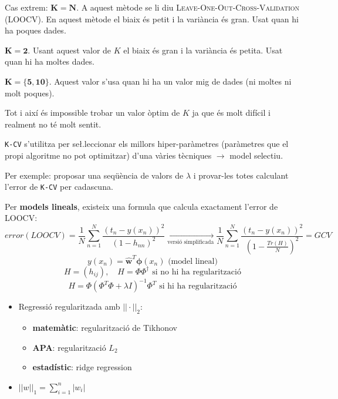 \documentclass[a4paper]{article}
\begin{document}
Cas extrem: $\boldsymbol{K=N}$. A aquest mètode se li diu \textsc{Leave-One-Out-Cross-Validation} (LOOCV). En aquest mètode el biaix és petit i la variància és gran. Usat quan hi ha poques dades.

$\boldsymbol{K=2}$. Usant aquest valor de $K$ el biaix és gran i la variància és petita. Usat quan hi ha moltes dades.

$\boldsymbol{K=\{5,10\}}$. Aquest valor s'usa quan hi ha un valor mig de dades (ni moltes ni molt poques).

Tot i així és impossible trobar un valor òptim de $K$ ja que és molt difícil i realment no té molt sentit.

\verb|K-CV| s'utilitza per se\l.leccionar els millors hiper-paràmetres (paràmetres que el propi algoritme no pot optimitzar) d'una vàries tècniques $\rightarrow$ model selectiu.

Per exemple: proposar una seqüència de valors de $\lambda$ i provar-les totes calculant l'error de \verb|K-CV| per cadascuna.

Per \textbf{models lineals}, existeix una formula que calcula exactament l'error de LOOCV:
$$
error(LOOCV) = \frac{1}{N} \sum_{n=1}^N \frac{\left(t_n - y(x_n)\right)^2}{(1 - h_{nn})^2} \underset{\text{versió simplificada}}{\longrightarrow}
\frac{1}{N} \sum_{n=1}^N \frac{(t_n - y(x_n))^2}{\left(1 - \frac{Tr(H)}{N}\right)^2} = GCV
$$
$$
y(x_n) = \hat{\boldsymbol{w}}^T \boldsymbol{\phi} (x_n) \text{ (model lineal)}
$$
$$
H = (h_{ij}), \quad H = \Phi \Phi^{\dag} \text{ si no hi ha regularització}
$$
$$
H = \Phi \left( \Phi^T \Phi + \lambda I \right)^{-1} \Phi^T \text{ si hi ha regularització}
$$

\begin{itemize}
	\item Regressió regularitzada amb $||·||_2$:
	\begin{itemize}
		\item \textbf{matemàtic}: regularització de Tikhonov
		\item \textbf{APA}: regularització $L_2$
		\item \textbf{estadístic}: ridge regression
	\end{itemize}
	\item $||w||_1 = \sum_{i=1}^n |w_i|$
	
\end{itemize}
\end{document}
